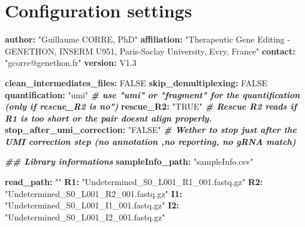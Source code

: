 \documentclass[
]{article}
\newenvironment{Shaded}{\begin{snugshade}}{\end{snugshade}}
\newcommand{\AttributeTok}[1]{\textcolor[rgb]{0.74,0.68,0.62}{#1}}
\newcommand{\CommentTok}[1]{\textcolor[rgb]{0.00,0.40,1.00}{\textbf{\textit{#1}}}}
\newcommand{\FunctionTok}[1]{\textcolor[rgb]{1.00,0.58,0.35}{\textbf{#1}}}
\newcommand{\KeywordTok}[1]{\textcolor[rgb]{0.26,0.66,0.93}{\textbf{#1}}}
\newcommand{\StringTok}[1]{\textcolor[rgb]{0.02,0.61,0.04}{#1}}
\begin{document}
\section{Configuration settings}\label{configuration-settings}

\begin{Shaded}
\begin{Highlighting}[]

\FunctionTok{author}\KeywordTok{:}\AttributeTok{ }\StringTok{"Guillaume CORRE, PhD"}
\FunctionTok{affiliation}\KeywordTok{:}\AttributeTok{ }\StringTok{"Therapeutic Gene Editing {-} GENETHON, INSERM U951, Paris{-}Saclay University, Evry, France"}
\FunctionTok{contact}\KeywordTok{:}\AttributeTok{ }\StringTok{"gcorre@genethon.fr"}
\FunctionTok{version}\KeywordTok{:}\AttributeTok{ }\StringTok{\textquotesingle{}V1.3\textquotesingle{}}

\FunctionTok{clean\_intermediates\_files}\KeywordTok{:}\AttributeTok{ }\StringTok{\textquotesingle{}FALSE\textquotesingle{}}
\FunctionTok{skip\_demultiplexing}\KeywordTok{:}\AttributeTok{ }\StringTok{\textquotesingle{}FALSE\textquotesingle{}}
\FunctionTok{quantification}\KeywordTok{:}\AttributeTok{ }\StringTok{"umi"}\CommentTok{                \# use "umi" or "fragment" for the quantification (only if rescue\_R2 is \textquotesingle{}no")}
\FunctionTok{rescue\_R2}\KeywordTok{:}\AttributeTok{ }\StringTok{"TRUE"}\CommentTok{                    \# Rescue R2 reads if R1 is too short or the pair doesn\textquotesingle{}t align properly.}
\FunctionTok{stop\_after\_umi\_correction}\KeywordTok{:}\AttributeTok{ }\StringTok{"FALSE"}\CommentTok{    \# Wether to stop just after the UMI correction step (no annotation ,no reporting, no gRNA match)}


\CommentTok{\#\# Library informations}
\FunctionTok{sampleInfo\_path}\KeywordTok{:}\AttributeTok{ }\StringTok{"sampleInfo.csv"}

\FunctionTok{read\_path}\KeywordTok{:}\AttributeTok{  }\StringTok{""}
\FunctionTok{R1}\KeywordTok{:}\AttributeTok{ }\StringTok{"Undetermined\_S0\_L001\_R1\_001.fastq.gz"}
\FunctionTok{R2}\KeywordTok{:}\AttributeTok{ }\StringTok{"Undetermined\_S0\_L001\_R2\_001.fastq.gz"}
\FunctionTok{I1}\KeywordTok{:}\AttributeTok{ }\StringTok{"Undetermined\_S0\_L001\_I1\_001.fastq.gz"}
\FunctionTok{I2}\KeywordTok{:}\AttributeTok{ }\StringTok{"Undetermined\_S0\_L001\_I2\_001.fastq.gz"}



\end{Highlighting}
\end{Shaded}
\end{document}
